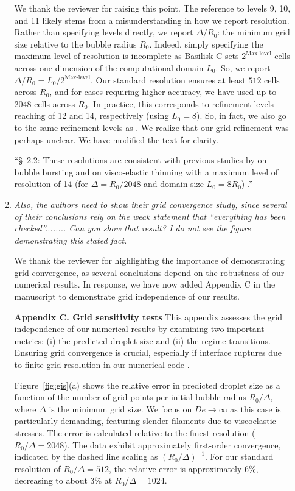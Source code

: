 \documentclass[]{article}
\newcommand{\oo}{\color{magenta} \normalfont}
\newcommand{\bb}{\color{black} \normalfont}
\begin{document}
\begin{enumerate}
\begin{enumerate}
        We thank the reviewer for raising this point. The reference to levels 9, 10, and 11 likely stems from a misunderstanding in how we report resolution. Rather than specifying levels directly, we report $\Delta/R_0$: the minimum grid size relative to the bubble radius $R_0$. Indeed, simply specifying the maximum level of resolution is incomplete as Basilisk C sets $2^{\text{Max-level}}$ cells across one dimension of the computational domain $L_0$. So, we report $\Delta/R_0 = L_0/2^{\text{Max-level}}$. 
        Our standard resolution ensures at least $512$ cells across $R_0$, and for cases requiring higher accuracy, we have used up to $2048$ cells across $R_0$. In practice, this corresponds to refinement levels reaching of 12 and 14, respectively (using $L_0 = 8$). So, in fact, we also go to the same refinement levels as \citet{berny2020role,berny2021statistics,turkoz2018axisymmetric,turkoz2021simulation}. We realize that our grid refinement was perhaps unclear. We have modified the text for clarity.

        ``\S~2.2: \oo
        These resolutions are consistent with previous studies by \citet{berny2020role,berny2021statistics} on bubble bursting and \citet{turkoz2018axisymmetric,turkoz2021simulation} on visco-elastic thinning with a maximum level of resolution of 14 (for $\Delta = R_0/2048$ and domain size $L_0 = 8R_0$)\bb.''

        \item \textit{Also, the authors need to show their grid convergence study, since several of their conclusions rely on the weak statement that “everything has been checked”........ Can you show that result? I do not see the figure demonstrating this stated fact.}

        We thank the reviewer for highlighting the importance of demonstrating grid convergence, as several conclusions depend on the robustness of our numerical results. In response, we have now added Appendix C in the manuscript to demonstrate grid independence of our results.  

        \oo
\textbf{Appendix C. Grid sensitivity tests}
This appendix assesses the grid independence of our numerical results by examining two important metrics: (i) the predicted droplet size and (ii) the regime transitions. Ensuring grid convergence is crucial, especially if interface ruptures due to finite grid resolution in our numerical code \citep{lohse-2020-pnas,chirco2022manifold,kant2023bag}. 

Figure~\ref{fig:gis}(a) shows the relative error in predicted droplet size as a function of the number of grid points per initial bubble radius $R_0/\Delta$, where $\Delta$ is the minimum grid size. We focus on $De \to \infty$ as this case is particularly demanding, featuring slender filaments due to viscoelastic stresses. The error is calculated relative to the finest resolution ($R_0/\Delta = 2048$). 
The data exhibit approximately first-order convergence, indicated by the dashed line scaling as $(R_0/\Delta)^{-1}$. 
For our standard resolution of $R_0/\Delta = 512$, the relative error is approximately 6\%, decreasing to about 3\% at $R_0/\Delta = 1024$.


\end{enumerate}
\end{enumerate}
\end{document}
